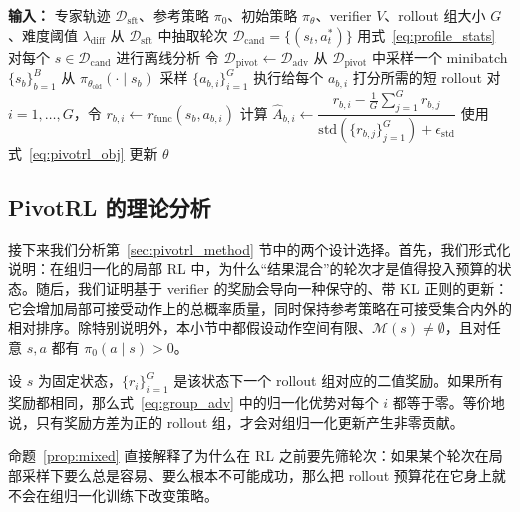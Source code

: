 \begin{algorithm}[t]
\caption{PivotRL}
\label{alg:pivotrl}
\begin{algorithmic}[1]
\State \textbf{输入：} 专家轨迹 $\mathcal{D}_{\mathrm{sft}}$、参考策略 $\pi_0$、初始策略 $\pi_\theta$、verifier $V$、rollout 组大小 $G$、难度阈值 $\lambda_{\mathrm{diff}}$
\State 从 $\mathcal{D}_{\mathrm{sft}}$ 中抽取轮次 $\mathcal{D}_{\mathrm{cand}}=\{(s_t,a_t^*)\}$
\State 用式~\eqref{eq:profile_stats} 对每个 $s\in\mathcal{D}_{\mathrm{cand}}$ 进行离线分析
\State 令 $\mathcal{D}_{\mathrm{pivot}}\leftarrow \mathcal{D}_{\mathrm{adv}}$
    \State 从 $\mathcal{D}_{\mathrm{pivot}}$ 中采样一个 minibatch $\{s_b\}_{b=1}^B$
        \State 从 $\pi_{\theta_{\mathrm{old}}}(\cdot\mid s_b)$ 采样 $\{a_{b,i}\}_{i=1}^G$
        \State 执行给每个 $a_{b,i}$ 打分所需的短 rollout
        \State 对 $i=1,\dots,G$，令 $r_{b,i}\leftarrow r_{\mathrm{func}}(s_b,a_{b,i})$
        \State 计算 $\hat{A}_{b,i}\leftarrow \dfrac{r_{b,i}-\frac{1}{G}\sum_{j=1}^G r_{b,j}}{\mathrm{std}(\{r_{b,j}\}_{j=1}^G) + \epsilon_{\mathrm{std}}}$
    \EndFor
    \State 使用式~\eqref{eq:pivotrl_obj} 更新 $\theta$
\EndFor
\end{algorithmic}
\end{algorithm}

\subsection{PivotRL 的理论分析}
\label{sec:pivotrl_analysis}

接下来我们分析第~\ref{sec:pivotrl_method} 节中的两个设计选择。首先，我们形式化说明：在组归一化的局部 RL 中，为什么“结果混合”的轮次才是值得投入预算的状态。随后，我们证明基于 verifier 的奖励会导向一种保守的、带 KL 正则的更新：它会增加局部可接受动作上的总概率质量，同时保持参考策略在可接受集合内外的相对排序。除特别说明外，本小节中都假设动作空间有限、$\mathcal{M}(s)\neq\emptyset$，且对任意 $s,a$ 都有 $\pi_0(a\mid s)>0$。

\begin{proposition}[只有结果混合的轮次才会产生非零的组归一化更新]
\label{prop:mixed}
设 $s$ 为固定状态，$\{r_i\}_{i=1}^G$ 是该状态下一个 rollout 组对应的二值奖励。如果所有奖励都相同，那么式~\eqref{eq:group_adv} 中的归一化优势对每个 $i$ 都等于零。等价地说，只有奖励方差为正的 rollout 组，才会对组归一化更新产生非零贡献。
\end{proposition}

命题~\ref{prop:mixed} 直接解释了为什么在 RL 之前要先筛轮次：如果某个轮次在局部采样下要么总是容易、要么根本不可能成功，那么把 rollout 预算花在它身上就不会在组归一化训练下改变策略。

